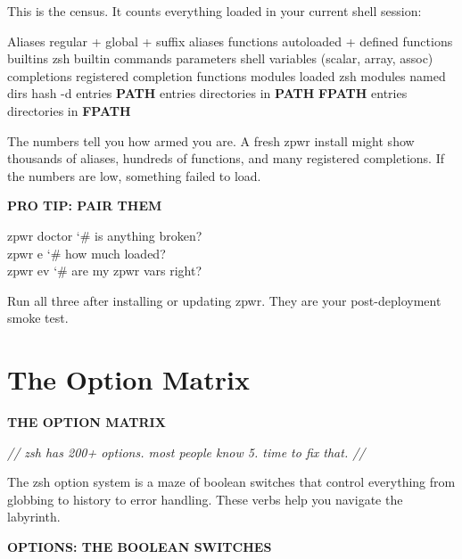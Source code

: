 \documentclass[11pt,a4paper,twoside]{book}
\begin{document}
This is the census. It counts everything loaded in your current shell session:

Aliases         regular + global + suffix aliases functions       autoloaded + defined functions builtins        zsh builtin commands parameters      shell variables (scalar, array, assoc) completions     registered completion functions modules         loaded zsh modules named dirs      hash -d entries \textbf{PATH} entries    directories in \textbf{PATH} \textbf{FPATH} entries   directories in \textbf{FPATH}

The numbers tell you how armed you are. A fresh zpwr install might show thousands of aliases, hundreds of functions, and many registered completions. If the numbers are low, something failed to load.


\vspace{12pt}
{\bfseries\color{neonyellow} PRO TIP: PAIR THEM}\vspace{4pt}

\begin{codebox}
\color{neongreen}zpwr doctor                   {\char`\#} is anything broken?\\
\color{neongreen}zpwr e                         {\char`\#} how much loaded?\\
\color{neongreen}zpwr ev                        {\char`\#} are my zpwr vars right?\\
\end{codebox}

Run all three after installing or updating zpwr. They are your post-deployment smoke test.


\vspace{16pt}

\section{The Option Matrix}


\vspace{10pt}
{\large\bfseries\color{neoncyan} THE OPTION MATRIX}\vspace{6pt}

{\small\itshape\color{dimtext} // zsh has 200+ options. most people know 5. time to fix that. //}

The zsh option system is a maze of boolean switches that control everything from globbing to history to error handling. These verbs help you navigate the labyrinth.


\vspace{12pt}
{\bfseries\color{neonyellow} OPTIONS: THE BOOLEAN SWITCHES}\vspace{4pt}
\end{document}
